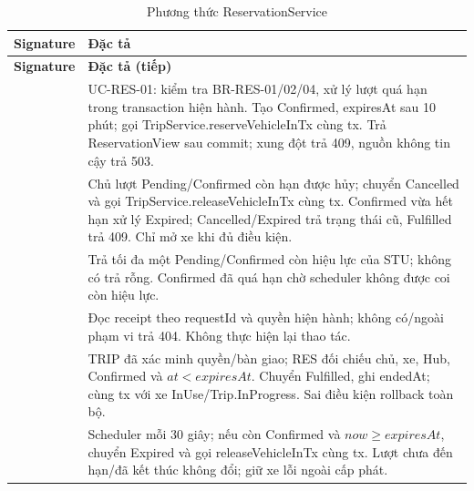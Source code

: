 \begin{longtable}{|L{58mm}|L{81mm}|}
\caption{Phương thức ReservationService}\\\hline
\textbf{Signature} & \textbf{Đặc tả}\\\hline
\endfirsthead
\hline\textbf{Signature} & \textbf{Đặc tả (tiếp)}\\\hline\endhead
{} & UC-RES-01: kiểm tra BR-RES-01/02/04, xử lý lượt quá hạn trong transaction hiện hành. Tạo Confirmed, expiresAt sau 10 phút; gọi TripService.reserveVehicleInTx cùng tx. Trả ReservationView sau commit; xung đột trả 409, nguồn không tin cậy trả 503.\\\hline
{} & Chủ lượt Pending/Confirmed còn hạn được hủy; chuyển Cancelled và gọi TripService.releaseVehicleInTx cùng tx. Confirmed vừa hết hạn xử lý Expired; Cancelled/Expired trả trạng thái cũ, Fulfilled trả 409. Chỉ mở xe khi đủ điều kiện.\\\hline
{} & Trả tối đa một Pending/Confirmed còn hiệu lực của STU; không có trả rỗng. Confirmed đã quá hạn chờ scheduler không được coi còn hiệu lực.\\\hline
{} & Đọc receipt theo requestId và quyền hiện hành; không có/ngoài phạm vi trả 404. Không thực hiện lại thao tác.\\\hline
{} & TRIP đã xác minh quyền/bàn giao; RES đối chiếu chủ, xe, Hub, Confirmed và $at<expiresAt$. Chuyển Fulfilled, ghi endedAt; cùng tx với xe InUse/Trip.InProgress. Sai điều kiện rollback toàn bộ.\\\hline
{} & Scheduler mỗi 30 giây; nếu còn Confirmed và $now\geq expiresAt$, chuyển Expired và gọi releaseVehicleInTx cùng tx. Lượt chưa đến hạn/đã kết thúc không đổi; giữ xe lỗi ngoài cấp phát.\\\hline
\end{longtable}


